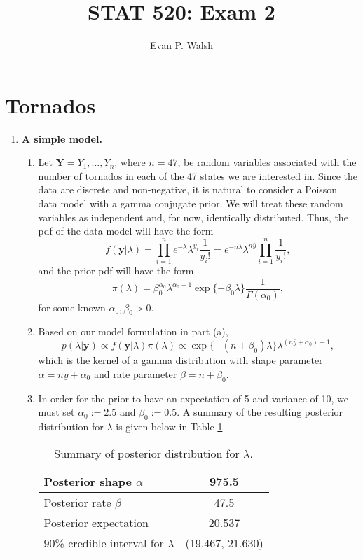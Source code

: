 \documentclass[12pt]{article}
\title{STAT 520: Exam 2}
\author{Evan P. Walsh}
\begin{document}

\section*{Tornados}

\begin{enumerate}
  \item \textbf{A simple model.}
    \begin{enumerate}
      \item Let $\bm{Y} = Y_1, \dots, Y_n$, where $n = 47$, be random variables associated with the number of tornados in each of the 47 states we are
        interested in. Since the data are discrete and non-negative, it is natural to consider a Poisson data model with a gamma conjugate prior.
        We will treat these random variables as independent and, for now, identically distributed. Thus,
        the pdf of the data model will have the form
        \[
          f(\bm{y}|\lambda) = \prod_{i=1}^{n} e^{-\lambda}\lambda^{y_i} \frac{1}{y_i!} = e^{-n\lambda}\lambda^{n\bar{y}}
          \prod_{i=1}^{n}\frac{1}{y_i!},
        \]
        and the prior pdf will have the form
        \[
          \pi(\lambda) = \beta_0^{\alpha_0} \lambda^{\alpha_0 - 1}\exp\{-\beta_0\lambda\} \frac{1}{\Gamma(\alpha_0)},
        \]
        for some known $\alpha_0, \beta_0 > 0$.

      \item Based on our model formulation in part (a),
        \[
          p(\lambda|\bm{y}) \propto f(\bm{y}|\lambda) \pi(\lambda) \propto \exp\{-(n + \beta_0)\lambda\} \lambda^{(n\bar{y} + \alpha_0) - 1},
        \]
        which is the kernel of a gamma distribution with shape parameter $\alpha = n\bar{y} + \alpha_0$ and rate parameter $\beta = n + \beta_0$.

      \item In order for the prior to have an expectation of 5 and variance of 10, we must set $\alpha_0 := 2.5$ and $\beta_0 := 0.5$. A summary of
        the resulting posterior distribution for $\lambda$ is given below in Table \ref{tab:1}.

        \begin{table}[h!]
          \centering
          \begin{tabular}{lc}
            \hline
            Posterior shape $\alpha$ & 975.5 \\
            \hline
            Posterior rate $\beta$ & 47.5  \\
            \hline
            Posterior expectation & 20.537 \\
            \hline
            90\% credible interval for $\lambda$ & (19.467, 21.630) \\
            \hline
          \end{tabular}
          \caption{Summary of posterior distribution for $\lambda$.}
          \label{tab:1}
        \end{table}


\end{enumerate}
\end{enumerate}
\end{document}
